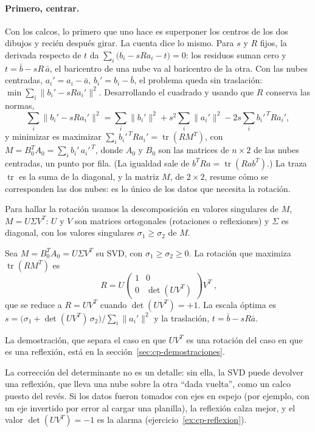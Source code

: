 \paragraph{Primero, centrar.} Con los calcos, lo primero que uno hace es superponer los centros
de los dos dibujos y recién después girar. La cuenta dice lo mismo. Para \(s\) y \(R\) fijos,
la derivada respecto de \(t\) da
\(\sum_i\big(b_i-sRa_i-t\big)=0\): los residuos suman cero y \(t=\bar b-sR\,\bar a\), el
baricentro de una nube va al baricentro de la otra. Con las nubes centradas,
\(a_i'=a_i-\bar a\), \(b_i'=b_i-\bar b\), el problema queda sin traslación:
\(\min\sum_i\lVert b_i'-sRa_i'\rVert^2\). Desarrollando el cuadrado y usando que \(R\)
conserva las normas,
\[
  \sum_i\lVert b_i'-sRa_i'\rVert^2=\sum_i\lVert b_i'\rVert^2+s^2\sum_i\lVert a_i'\rVert^2
  -2s\sum_i b_i'^{\,T}Ra_i',
\]
y minimizar es maximizar \(\sum_ib_i'^{\,T}Ra_i'=\operatorname{tr}(RM^T)\), con
\(M=B_0^TA_0=\sum_i b_i'\,a_i'^{\,T}\), donde \(A_0\) y \(B_0\) son las matrices de \(n\times2\) de las nubes centradas, un punto por
fila. (La igualdad sale de \(b^TRa=\operatorname{tr}(Rab^T)\).) La traza \(\operatorname{tr}\)
es la suma de la diagonal, y la matriz \(M\), de \(2\times2\), resume cómo se corresponden las
dos nubes: es lo único de los datos que necesita la rotación.

Para hallar la rotación usamos la descomposición en valores singulares de \(M\),
\(M=U\Sigma V^T\): \(U\) y \(V\) son matrices ortogonales (rotaciones o reflexiones) y
\(\Sigma\) es diagonal, con los valores singulares \(\sigma_1\ge\sigma_2\) de \(M\).

\begin{proposicion}\label{prop:cp-procrustes}
Sea \(M=B_0^TA_0=U\Sigma V^T\) su SVD, con \(\sigma_1\ge\sigma_2\ge0\). La rotación que
maximiza \(\operatorname{tr}(RM^T)\) es
\[
  \boxed{\ R=U\begin{pmatrix}1&0\\0&\det(UV^T)\end{pmatrix}V^T\ } ,
\]
que se reduce a \(R=UV^T\) cuando \(\det(UV^T)=+1\). La escala óptima es
\(s=\big(\sigma_1+\det(UV^T)\,\sigma_2\big)\big/\sum_i\lVert a_i'\rVert^2\) y la traslación,
\(t=\bar b-sR\bar a\).
\end{proposicion}

La demostración, que separa el caso en que \(UV^T\) es una rotación del caso en que es una
reflexión, está en la sección~\ref{sec:cp-demostraciones}.

La corrección del determinante no es un detalle: sin ella, la SVD puede devolver una
reflexión, que lleva una nube sobre la otra \enquote{dada vuelta}, como un calco puesto del
revés. Si los datos fueron tomados con ejes en espejo (por ejemplo, con un eje invertido por
error al cargar una planilla), la reflexión calza mejor, y el valor \(\det(UV^T)=-1\) es la
alarma (ejercicio~\ref{ex:cp-reflexion}).

